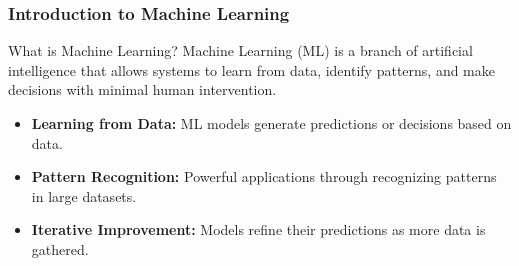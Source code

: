 \documentclass[aspectratio=169]{beamer}
\begin{document}
\frame{\titlepage}

\begin{frame}[fragile]
    \maketitle
\end{frame}

\begin{frame}[fragile]
    \frametitle{Introduction to Machine Learning}
    
    \begin{block}{What is Machine Learning?}
    Machine Learning (ML) is a branch of artificial intelligence that allows systems to learn from data, identify patterns, and make decisions with minimal human intervention.
    \end{block}
    
    \begin{itemize}
        \item \textbf{Learning from Data:} ML models generate predictions or decisions based on data.
        \item \textbf{Pattern Recognition:} Powerful applications through recognizing patterns in large datasets.
        \item \textbf{Iterative Improvement:} Models refine their predictions as more data is gathered.
    \end{itemize}
\end{frame}
\end{document}
